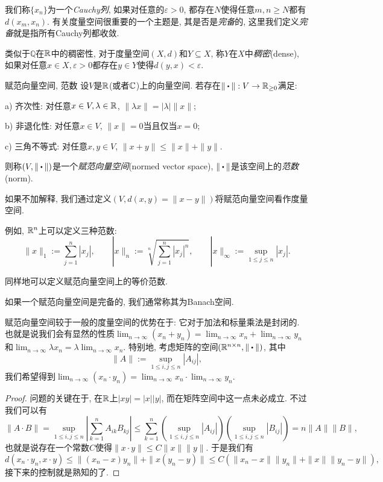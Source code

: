 我们称$\{ x_n \}$为一个\textit{Cauchy列}, 如果对任意的$\varepsilon >0$, 都存在$N$使得任意$m,n \geq N$都有$d(x_m,x_n)$. 有关度量空间很重要的一个主题是, 其是否是\textit{完备}的, 这里我们定义\textit{完备}就是指所有Cauchy列都收敛. 

类似于$\mathbb{Q}$在$\mathbb{R}$中的稠密性, 对于度量空间$(X,d)$和$Y \subseteq X$, 称$Y$在$X$中\textit{稠密}(dense), 如果对任意$x \in X, \varepsilon >0$都存在$y \in Y$使得$d(y,x) < \varepsilon$. 

\begin{definition}{赋范向量空间, 范数}
	设$V$是$\mathbb{R}$(或者$\mathbb{C}$)上的向量空间. 若存在$\| \bigcdot \|:V \to \R _{\geq 0}$满足: 
	
	a) 齐次性: 对任意$x \in V, \lambda \in \mathbb{R}$, $\| \lambda x \|=|\lambda | \| x \|$; 
	
	b) 非退化性: 对任意$x \in V$, $\| x \|=0$当且仅当$x=0$; 
	
	c) 三角不等式: 对任意$x,y \in V$, $\| x+y \| \leq \| x \|+\| y \|$. 
	
	\noindent
	则称$(V,\| \bigcdot \| )$是一个\textit{赋范向量空间}(normed vector space), $\| \bigcdot \|$是该空间上的\textit{范数}(norm). 
\end{definition}
\begin{remark}
	如果不加解释, 我们通过定义$(V,d(x,y)=\| x-y \|)$将赋范向量空间看作度量空间. 
\end{remark}

例如, $\mathbb{R} ^n$上可以定义三种范数: $$\| x \|_1 := \sum_{j=1}^n |x_j|,\qquad | x \|_n := \sqrt[n]{\sum_{j=1}^n |x_j|^n},\qquad | x \|_{\infty} := \sup_{1 \leq j \leq n}|x_j|. $$

同样地可以定义赋范向量空间上的等价范数. 

如果一个赋范向量空间是完备的, 我们通常称其为Banach空间. 

赋范向量空间较于一般的度量空间的优势在于: 它对于加法和标量乘法是封闭的. 也就是说我们会有显然的性质$\lim_{n\to \infty} (x_n+y_n) = \lim_{n\to \infty} x_n + \lim_{n\to \infty} y_n$和$\lim_{n\to \infty} \lambda x_n = \lambda \lim_{n\to \infty} x_n$. 特别地, 考虑矩阵的空间$(\R ^{n\times n},\| \bigcdot \|)$, 其中$$\| A \| := \sup_{1 \leq i,j \leq n} |A_{ij}|,$$
我们希望得到$\lim_{n\to \infty} (x_n \cdot y_n) = \lim_{n\to \infty} x_n \cdot \lim_{n\to \infty} y_n$. 
\begin{proof}
	问题的关键在于, 在$\mathbb{R}$上$|xy|=|x||y|$, 而在矩阵空间中这一点未必成立. 不过我们可以有$$\| A \cdot B \| = \sup_{1 \leq i,j \leq n} |\sum_{k=1}^{n}A_{ik}B_{kj}| \leq \sum_{k=1}^n (\sup_{1 \leq i,j \leq n} |A_{ij}|)(\sup_{1 \leq i,j \leq n} |B_{ij}|) = n\| A \| \| B \|,$$
	也就是说存在一个常数$C$使得$\| x\cdot y \| \leq C\| x \| \| y \|$. 于是我们有$$d(x_n \cdot y_n,x \cdot y) \leq \| (x_n-x)y_n \| 
		+ \| x(y_n-y) \| \leq C(\| x_n-x \| \| y_n \| 
		+ \| x \| \| y_n-y \|),$$
	接下来的控制就是熟知的了. 
\end{proof}

